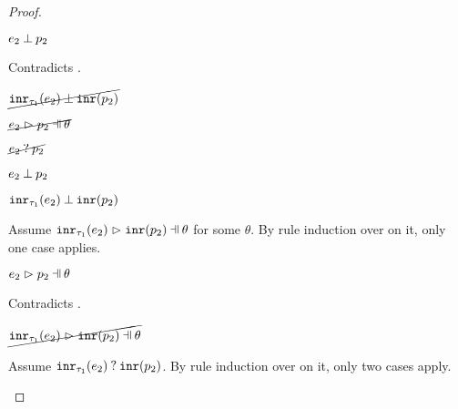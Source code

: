 \begin{proof}
\begin{byCases}
\begin{byCases}
\begin{byCases}
\begin{byCases}
            \item[\text{(\ref{rule:NMInr})}]
                \begin{pfsteps*}
                \item $e_2 \mathbin{\bot} p_2$ 
                \end{pfsteps*}
                Contradicts .
            \end{byCases}
            \begin{pfsteps*}
            \item $\cancel{\mathtt{inr}_{\tau_1}({e_2}) \mathbin{\bot} \mathtt{inr}(p_2)}$ 
            \end{pfsteps*}
        \item[\hnotmatch{e_2}{p_2}]
            \begin{pfsteps*}
            \item $\cancel{\hpatmatch{e_2}{p_2}{\theta}}$  
            \item $\cancel{e_2 \mathbin{?} p_2}$  
            \item $e_2 \mathbin{\bot} p_2$  
            \item $\mathtt{inr}_{\tau_1}({e_2}) \mathbin{\bot} \mathtt{inr}(p_2)$ 
            \end{pfsteps*}
            Assume $\hpatmatch{\hinr{\tau_1}{e_2}}{\hinrp{p_2}}{\theta}$ for some $\theta$. By rule induction over  on it, only one case applies.
            \begin{byCases}
            \item[\text{(\ref{rule:MInr})}]
                \begin{pfsteps*}
                \item $\hpatmatch{e_2}{p_2}{\theta}$ 
                \end{pfsteps*}
                Contradicts .
            \end{byCases}
            \begin{pfsteps*}
            \item $\cancel{\hpatmatch{\hinr{\tau_1}{e_2}}{\hinrp{p_2}}{\theta}}$ 
            \end{pfsteps*}
            Assume $\mathtt{inr}_{\tau_1}({e_2}) \mathbin{?} \mathtt{inr}(p_2)$. By rule induction over  on it, only two cases apply.

\end{byCases}
\end{byCases}
\end{byCases}
\end{proof}
